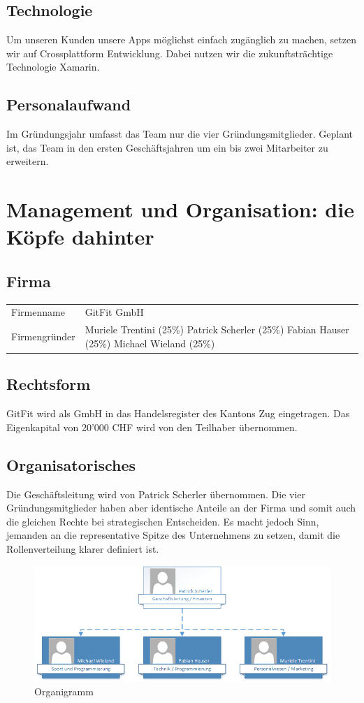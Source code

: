 \subsection{Technologie}
Um unseren Kunden unsere Apps möglichst einfach zugänglich zu machen, setzen wir auf Crossplattform Entwicklung. Dabei nutzen wir die zukunftsträchtige Technologie Xamarin.
\subsection{Personalaufwand}
Im Gründungsjahr umfasst das Team nur die vier Gründungsmitglieder. Geplant ist, das Team in den ersten Geschäftsjahren um ein bis zwei Mitarbeiter zu erweitern.

\section{Management und Organisation: die Köpfe dahinter}

\subsection{Firma}
\begin{tabu} to \linewidth {l X}
	Firmenname & GitFit GmbH \\
	Firmengründer & Muriele Trentini (25\%)  \newline Patrick Scherler (25\%) \newline Fabian Hauser (25\%) \newline Michael Wieland (25\%) \\
\end{tabu} 

\subsection{Rechtsform}
GitFit wird als GmbH in das Handelsregister des Kantons Zug eingetragen. Das Eigenkapital von 20'000 CHF wird von den Teilhaber übernommen.


\subsection{Organisatorisches}
Die Geschäftsleitung wird von Patrick Scherler übernommen. Die vier Gründungsmitglieder haben aber identische Anteile an der Firma und somit auch die gleichen Rechte bei strategischen Entscheiden. Es macht jedoch Sinn, jemanden an die representative Spitze des Unternehmens zu setzen, damit die Rollenverteilung klarer definiert ist.
\begin{figure}[h]
	\centering
	\includegraphics[width=0.9\linewidth]{images/organigramm}
	\caption{Organigramm}
	\label{fig:organigramm}
\end{figure}

